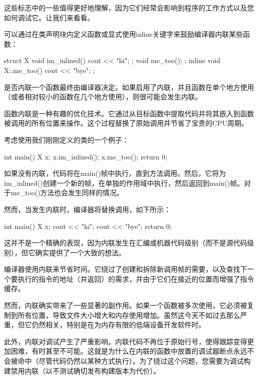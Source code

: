 这些标志中的一些值得更好地理解，因为它们经常会影响到程序的工作方式以及您如何调试它。让我们来看看。


可以通过在类声明块内定义函数或显式使用inline关键字来鼓励编译器内联某些函数：

\begin{cpp}
struct X {
    void im_inlined(){ cout << "hi\n"; };
    void me_too();
};
inline void X::me_too() { cout << "bye\n"; };
\end{cpp}

是否内联一个函数最终由编译器决定。如果启用了内联，并且函数在单个地方使用（或者相对较小的函数在几个地方使用），则很可能会发生内联。

函数内联是一种有趣的优化技术。它通过从目标函数中提取代码并将其嵌入到函数被调用的所有位置来操作。这个过程替换了原始调用并节省了宝贵的CPU周期。

考虑使用我们刚刚定义的类的一个例子：

\begin{cpp}
int main() {
    X x;
    x.im_inlined();
    x.me_too();
    return 0;
}
\end{cpp}

如果没有内联，代码将在main()帧中执行，直到方法调用。然后，它将为im\_inlined()创建一个新的帧，在单独的作用域中执行，然后返回到main()帧。对于me\_too()方法也会发生同样的情况。

然而，当发生内联时，编译器将替换调用，如下所示：

\begin{cpp}
int main() {
    X x;
    cout << "hi\n";
    cout << "bye\n";
    return 0;
}
\end{cpp}

这并不是一个精确的表现，因为内联发生在汇编或机器代码级别（而不是源代码级别），但它确实提供了一个大致的想法。

编译器使用内联来节省时间。它绕过了创建和拆除新调用帧的需要，以及查找下一个要执行的指令的地址（并返回）的需求，并由于它们在接近的位置而增强了指令缓存。

然而，内联确实带来了一些显著的副作用。如果一个函数被多次使用，它必须被复制到所有位置，导致文件大小增大和内存使用增加。虽然这今天不如过去那么严重，但它仍然相关，特别是在为内存有限的低端设备开发软件时。

此外，内联对调试产生了严重影响。内联代码不再位于原始行号，使得跟踪变得更加困难，有时甚至不可能。这就是为什么在内联的函数中放置的调试器断点永远不会被命中（尽管代码仍然以某种方式执行）。为了绕过这个问题，您需要为调试构建禁用内联（以不测试确切发布构建版本为代价）。

